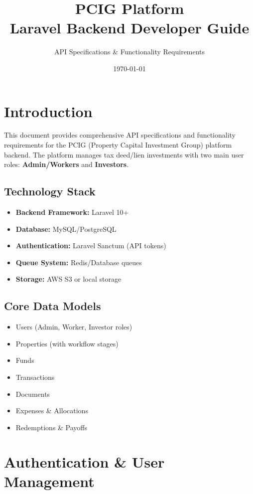 \documentclass[11pt,a4paper]{article}
\title{\textbf{PCIG Platform} \\ Laravel Backend Developer Guide}
\author{API Specifications \& Functionality Requirements}
\date{\today}
\begin{document}
\maketitle
\tableofcontents
\newpage

\section{Introduction}

This document provides comprehensive API specifications and functionality requirements for the PCIG (Property Capital Investment Group) platform backend. The platform manages tax deed/lien investments with two main user roles: \textbf{Admin/Workers} and \textbf{Investors}.

\subsection{Technology Stack}
\begin{itemize}
    \item \textbf{Backend Framework:} Laravel 10+
    \item \textbf{Database:} MySQL/PostgreSQL
    \item \textbf{Authentication:} Laravel Sanctum (API tokens)
    \item \textbf{Queue System:} Redis/Database queues
    \item \textbf{Storage:} AWS S3 or local storage
\end{itemize}

\subsection{Core Data Models}
\begin{itemize}
    \item Users (Admin, Worker, Investor roles)
    \item Properties (with workflow stages)
    \item Funds
    \item Transactions
    \item Documents
    \item Expenses \& Allocations
    \item Redemptions \& Payoffs
\end{itemize}

\newpage

\section{Authentication \& User Management}
\end{document}
